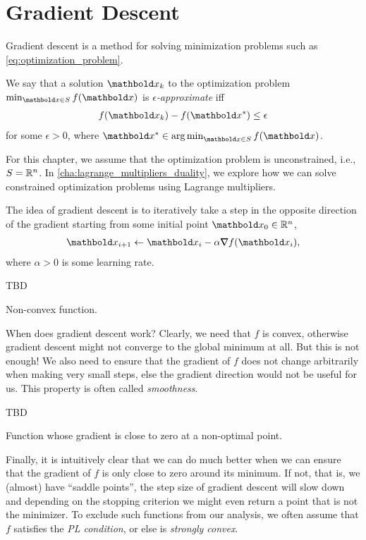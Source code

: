 
\chapter{Gradient Descent}

Gradient descent is a method for solving minimization problems such as \cref{eq:optimization_problem}.

\begin{defn}
We say that a solution $\vx_k$ to the optimization problem $\min_{\vx \in \sS} f(\vx)$ is \emph{$\epsilon$-approximate} iff \begin{align}
    f(\vx_k) - f(\s{\vx}) \leq \epsilon
\end{align} for some $\epsilon > 0$, where $\s{\vx} \in \argmin_{\vx \in \sS} f(\vx)$.
\end{defn}

For this chapter, we assume that the optimization problem is unconstrained, i.e., $S = \mathbb{R}^n$. In \cref{cha:lagrange_multipliers_duality}, we explore how we can solve constrained optimization problems using Lagrange multipliers.

The idea of gradient descent is to iteratively take a step in the opposite direction of the gradient starting from some initial point $\vx_0 \in \R^n$, \begin{align}
    \vx_{i+1} \gets \vx_i - \alpha \grad f(\vx_i),
\end{align} where $\alpha > 0$ is some learning rate.
\begin{marginfigure}
TBD
\caption{Non-convex function.}
\end{marginfigure}

When does gradient descent work? Clearly, we need that $f$ is convex, otherwise gradient descent might not converge to the global minimum at all. But this is not enough! We also need to ensure that the gradient of $f$ does not change arbitrarily when making very small steps, else the gradient direction would not be useful for us. This property is often called \emph{smoothness}.

\begin{marginfigure}
TBD
\caption{Function whose gradient is close to zero at a non-optimal point.}
\end{marginfigure}
Finally, it is intuitively clear that we can do much better when we can ensure that the gradient of $f$ is only close to zero around its minimum. If not, that is, we (almost) have ``saddle points'', the step size of gradient descent will slow down and depending on the stopping criterion we might even return a point that is not the minimizer. To exclude such functions from our analysis, we often assume that $f$ satisfies the \emph{PL condition}, or else is \emph{strongly convex}.

